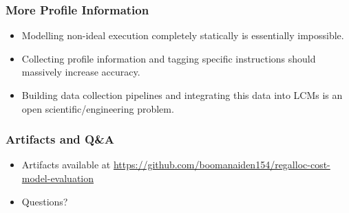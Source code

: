 \documentclass[light]{ucdbeamer}
\begin{document}
\begin{frame}[plain]
\frametitle{More Profile Information}
\begin{itemize}
  \item Modelling non-ideal execution completely statically is essentially impossible.
  \item Collecting profile information and tagging specific instructions should massively increase accuracy.
  \item Building data collection pipelines and integrating this data into LCMs is an open scientific/engineering problem.
\end{itemize}
\end{frame}

\begin{frame}[plain]
\frametitle{Artifacts and Q\&A}
\begin{itemize}
  \item Artifacts available at \url{https://github.com/boomanaiden154/regalloc-cost-model-evaluation}
  \item Questions?
\end{itemize}
\end{frame}
\end{document}
